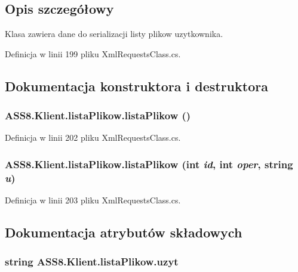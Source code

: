 \subsection{Opis szczegółowy}
Klasa zawiera dane do serializacji listy plikow uzytkownika. 



Definicja w linii 199 pliku XmlRequestsClass.cs.

\subsection{Dokumentacja konstruktora i destruktora}
\hypertarget{a00015_db427e61ff4a681f4f5c8b14e03ca3f9}{
\subsubsection[{listaPlikow}]{\setlength{\rightskip}{0pt plus 5cm}ASS8.Klient.listaPlikow.listaPlikow ()}}
\label{dd/d1b/a00015_db427e61ff4a681f4f5c8b14e03ca3f9}




Definicja w linii 202 pliku XmlRequestsClass.cs.\hypertarget{a00015_925a91ea5825c2e2d1e8aa98067a6196}{
\subsubsection[{listaPlikow}]{\setlength{\rightskip}{0pt plus 5cm}ASS8.Klient.listaPlikow.listaPlikow (int {\em id}, \/  int {\em oper}, \/  string {\em u})}}
\label{dd/d1b/a00015_925a91ea5825c2e2d1e8aa98067a6196}




Definicja w linii 203 pliku XmlRequestsClass.cs.

\subsection{Dokumentacja atrybutów składowych}
\hypertarget{a00015_5dbe6847bccf04113c46e7a32e7ccfa0}{
\subsubsection[{uzyt}]{\setlength{\rightskip}{0pt plus 5cm}string {\bf ASS8.Klient.listaPlikow.uzyt}}}
\label{dd/d1b/a00015_5dbe6847bccf04113c46e7a32e7ccfa0}




